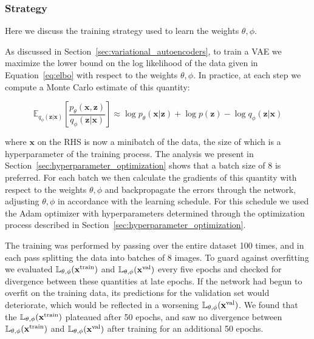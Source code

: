 \documentclass[fleqn,usenatbib]{mnras}
\begin{document}
\subsubsection{Strategy}
\label{sec:schedule} 

Here we discuss the training strategy used to learn the weights $\theta, \phi$.

As discussed in Section~\ref{sec:variational_autoencoders}, to train a VAE we maximize the lower bound on the log likelihood of the data given in Equation~\ref{eq:elbo} with respect to the weights $\theta, \phi$. In practice, at each step we compute a Monte Carlo estimate of this quantity:

\begin{equation}
    \mathbb{E}_{q_\phi(\mathbf z | \mathbf x)}\left[\frac{p_\theta(\mathbf x , \mathbf z)}{q_\phi(\mathbf z | \mathbf x)} \right] \approx \log p_\theta(\mathbf x | \mathbf z) + \log p(\mathbf z) - \log q_\phi(\mathbf z | \mathbf x)
\end{equation}

where $\mathbf x$ on the RHS is now a minibatch of the data, the size of which is a hyperparameter of the training process. The analysis we present in Section~\ref{sec:hyperparameter_optimization} shows that a batch size of 8 is preferred. For each batch we then calculate the gradients of this quantity with respect to the weights $\theta, \phi$ and backpropagate the errors through the network, adjusting $\theta, \phi$ in accordance with the learning schedule. For this schedule we used the Adam optimizer with hyperparameters determined through the optimization process described in Section~\ref{sec:hyperparameter_optimization}.

The training was performed by passing over the entire dataset 100 times, and in each pass splitting the data into batches of 8 images. To guard against overfitting we evaluated $\mathbb{L}_{\theta, \phi}(\mathbf x^{\rm train})$ and $\mathbb{L}_{\theta, \phi}(\mathbf x^{\rm val})$ every five epochs and checked for divergence between these quantities at late epochs. If the network had begun to overfit on the training data, its predictions for the validation set would deteriorate, which would be reflected in a worsening $\mathbb{L}_{\theta, \phi}(\mathbf x^{\rm val})$. We found that the $\mathbb{L}_{\theta, \phi}(\mathbf x^{\rm train})$ plateaued after 50 epochs, and saw no divergence between $\mathbb{L}_{\theta, \phi}(\mathbf x^{\rm train})$ and $\mathbb{L}_{\theta, \phi}(\mathbf x^{\rm val})$ after training for an additional 50 epochs. 
\end{document}
